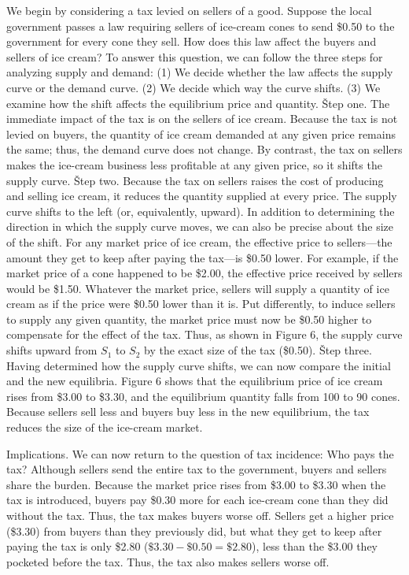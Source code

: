 We begin by considering a tax levied on sellers of a good. Suppose the local government passes a law requiring
sellers of ice-cream cones to send \$0.50 to the government for every cone they sell. How does this law affect the
buyers and sellers of ice cream? To answer this question, we can follow the three steps for analyzing supply and
demand: (1) We decide whether the law affects the supply curve or the demand curve. (2) We decide which way the curve
shifts. (3) We examine how the shift affects the equilibrium price and quantity. \v

Step one. The immediate impact of the tax is on the sellers of ice cream. Because the tax is not levied on buyers,
the quantity of ice cream demanded at any given price remains the same; thus, the demand curve does not change. By
contrast, the tax on sellers makes the ice-cream business less profitable at any given price, so it shifts the supply
curve. \v

Step two. Because the tax on sellers raises the cost of producing and selling ice cream, it reduces the quantity
supplied at every price. The supply curve shifts to the left (or, equivalently, upward). In addition to determining
the direction in which the supply curve moves, we can also be precise about the size of the shift. For any market
price of ice cream, the effective price to sellers—the amount they get to keep after paying the tax—is \$0.50 lower.
For example, if the market price of a cone happened to be \$2.00, the effective price received by sellers would be
\$1.50. Whatever the market price, sellers will supply a quantity of ice cream as if the price were \$0.50 lower than
it is. Put differently, to induce sellers to supply any given quantity, the market price must now be \$0.50 higher to
compensate for the effect of the tax. Thus, as shown in Figure 6, the supply curve shifts upward from $S_1$ to $S_2$
by the exact size of the tax (\$0.50). \v

Step three. Having determined how the supply curve shifts, we can now compare the initial and the new equilibria.
Figure 6 shows that the equilibrium price of ice cream rises from \$3.00 to \$3.30, and the equilibrium quantity
falls from 100 to 90 cones. Because sellers sell less and buyers buy less in the new equilibrium, the tax reduces the
size of the ice-cream market.


Implications. We can now return to the question of tax incidence: Who pays the tax? Although sellers send the entire
tax to the government, buyers and sellers share the burden. Because the market price rises from \$3.00 to \$3.30 when
the tax is introduced, buyers pay \$0.30 more for each ice-cream cone than they did without the tax. Thus, the tax
makes buyers worse off. Sellers get a higher price (\$3.30) from buyers than they previously did, but what they get
to keep after paying the tax is only \$2.80 ($\$3.30 - \$0.50 = \$2.80$), less than the \$3.00 they pocketed before
the tax. Thus, the tax also makes sellers worse off.

